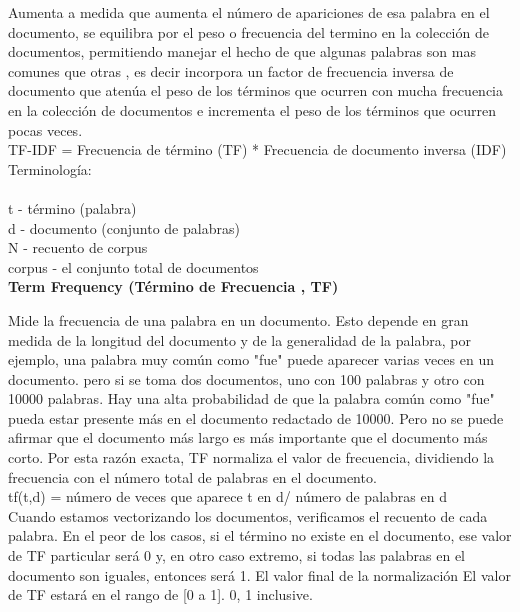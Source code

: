Aumenta a medida que aumenta el número de apariciones de esa palabra en el documento,
se equilibra por el peso o frecuencia del termino en la colección 
de documentos, permitiendo manejar el hecho de que algunas palabras son mas comunes que otras ,
es decir incorpora un factor de frecuencia inversa de documento que atenúa el peso de los términos que ocurren con mucha frecuencia en la colección de documentos e 
incrementa el peso de los términos que ocurren pocas veces.\\

TF-IDF = Frecuencia de término (TF) * Frecuencia de documento inversa (IDF)  \\ 

Terminología:\\ \\ t - término (palabra)  \\
d - documento (conjunto de palabras) \\
N - recuento de corpus \\
corpus - el conjunto total de documentos \\

\textbf{Term Frequency (Término de Frecuencia , TF)}

Mide la frecuencia de una palabra en un documento. Esto depende en gran medida de la longitud del documento y de
la generalidad de la palabra, por ejemplo, una palabra muy común como "fue" puede aparecer varias veces en un documento. 
pero si se toma dos documentos, uno con 100 palabras y otro con 10000 palabras. Hay una alta probabilidad de que la palabra
común como "fue" pueda estar presente más en el documento redactado de 10000. 
Pero no se puede afirmar que el documento más largo es más importante que el documento más corto. 
Por esta razón exacta, TF  normaliza  el valor de frecuencia, dividiendo la frecuencia 
con el número total de palabras en el documento.\\

tf(t,d) = número de veces que aparece t en d/ número de palabras en d \\


Cuando estamos vectorizando los documentos, verificamos el recuento de cada palabra.
En el peor de los casos, si el término no existe en el documento, ese valor de TF particular será 0 y,
en otro caso extremo, si todas las palabras en el documento son iguales, entonces será 1. 
El valor final de la normalización El valor de TF estará en el rango de [0 a 1]. 0, 1 inclusive.


